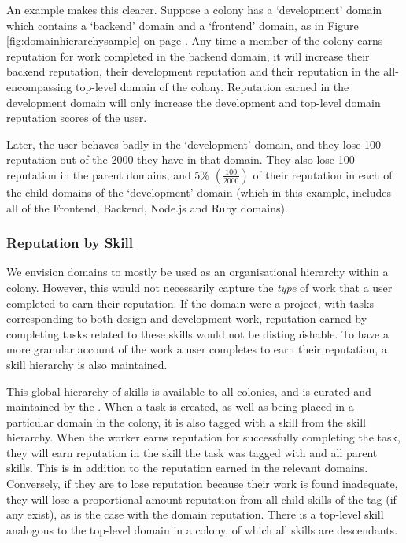 An example makes this clearer. Suppose a colony has a `development' domain which contains a `backend' domain and a `frontend' domain, as in Figure \ref{fig:domainhierarchysample} on page \pageref{fig:domainhierarchysample}. Any time a member of the colony earns reputation for work completed in the backend domain, it will increase their backend reputation, their development reputation and their reputation in the all-encompassing top-level domain of the colony. Reputation earned in the development domain will only increase the development and top-level domain reputation scores of the user.

Later, the user behaves badly in the `development' domain, and they lose 100 reputation out of the 2000 they have in that domain. They also lose 100 reputation in the parent domains, and 5\% $\left(\frac{100}{2000}\right)$ of their reputation in each of the child domains of the `development' domain (which in this example, includes all of the Frontend, Backend, Node.js and Ruby domains). 

\subsubsection{Reputation by Skill}\label{sec:rep-by-skill}

We envision domains to mostly be used as an organisational hierarchy within a colony. However, this would not necessarily capture the \emph{type} of work that a user completed to earn their reputation. If the domain were a project, with tasks corresponding to both design and development work, reputation earned by completing tasks related to these skills would not be distinguishable. To have a more granular account of the work a user completes to earn their reputation, a skill hierarchy is also maintained.

This global hierarchy of skills is available to all colonies, and is curated and maintained by the \rc. When a task is created, as well as being placed in a particular domain in the colony, it is also tagged with a skill from the skill hierarchy. When the worker earns reputation for successfully completing the task, they will earn reputation in the skill the task was tagged with and all parent skills. This is in addition to the reputation earned in the relevant domains. Conversely, if they are to lose reputation because their work is found inadequate, they will lose a proportional amount reputation from all child skills of the tag (if any exist), as is the case with the domain reputation. There is a top-level skill analogous to the top-level domain in a colony, of which all skills are descendants.

